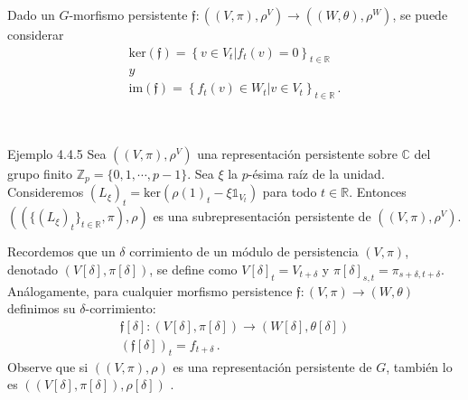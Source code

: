 \documentclass{beamer}
\newcounter{Ejercicio}
\begin{document}
\begin{frame}
Dado un $G$-morfismo persistente $\mathfrak{f}:((V,\pi),\rho^V)\rightarrow ((W,\theta),\rho^W)$, se puede considerar
\begin{gather*}
\mbox{ker}(\mathfrak{f})=\left\{  v\in V_t \vert f_t(v)=0\right\}_{t\in \mathbb{R}}\\
y\\
\mbox{im}(\mathfrak{f})=\left\{ f_t(v)\in W_t\vert v\in V_t\right\}_{t\in \mathbb{R}}\,.
\end{gather*}

\begin{minipage}{0.25\textwidth}

\end{minipage}\hfill{}\\
\begin{block}{Ejemplo 4.4.5}
Sea $((V,\pi),\rho^V)$ una representaci\'on persistente sobre $\mathbb{C}$ del grupo finito $\mathbb{Z}_p = \{0, 1, \cdots, p - 1\}$. Sea $\xi$ la $p$-\'esima ra\'iz de la unidad. Consideremos $(L_\xi)_t=\mbox{ker}(\rho(1)_t-\xi\mathbb{1}_{V_t})$ para todo $t\in \mathbb{R}$. Entonces $((\{ (L_\xi)_t \}_{t\in\mathbb{R}} , \pi), \rho)$ es una subrepresentaci\'on persistente de $((V,\pi),\rho^V)$.
\end{block}
\end{frame}


\begin{frame}
Recordemos que un $\delta$ corrimiento de un m\'odulo de persistencia $(V,\pi)$, denotado $(V[\delta],\pi[\delta])$, se define como $V[\delta]_{t}=V_{t+\delta}$ y $\pi[\delta]_{s,t}=\pi_{s+\delta,t+\delta}$. An\'alogamente, para cualquier morfismo persistence $\mathfrak{f}:(V,\pi)\rightarrow (W,\theta)$ definimos su $\delta$-corrimiento:
\begin{gather*}
\mathfrak{f}[\delta]:(V[\delta],\pi[\delta])\rightarrow(W[\delta],\theta[\delta])\\
(\mathfrak{f}[\delta])_t=f_{t+\delta}\,.
\end{gather*}
Observe que si $((V,\pi),\rho)$ es una representaci\'on persistente de $G$, tambi\'en lo es $((V[\delta],\pi[\delta]),\rho[\delta])$ .
\end{frame}
\end{document}
